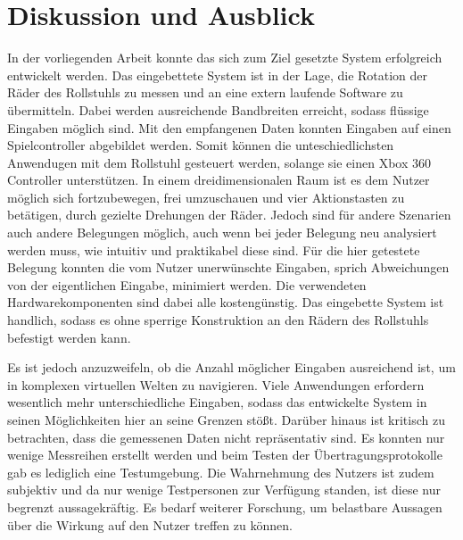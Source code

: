 \chapter{Diskussion und Ausblick}
In der vorliegenden Arbeit konnte das sich zum Ziel gesetzte System erfolgreich entwickelt werden.
Das eingebettete System ist in der Lage, die Rotation der Räder des Rollstuhls zu messen und an eine extern laufende Software zu übermitteln.
Dabei werden ausreichende Bandbreiten erreicht, sodass flüssige Eingaben möglich sind.
Mit den empfangenen Daten konnten Eingaben auf einen Spielcontroller abgebildet werden.
Somit können die unteschiedlichsten Anwendugen mit dem Rollstuhl gesteuert werden, solange sie einen Xbox 360 Controller unterstützen.
In einem dreidimensionalen Raum ist es dem Nutzer möglich sich fortzubewegen, frei umzuschauen und vier Aktionstasten zu betätigen, durch gezielte Drehungen der Räder.
Jedoch sind für andere Szenarien auch andere Belegungen möglich, auch wenn bei jeder Belegung neu analysiert werden muss, wie intuitiv und praktikabel diese sind.
Für die hier getestete Belegung konnten die vom Nutzer unerwünschte Eingaben, sprich Abweichungen von der eigentlichen Eingabe, minimiert werden.
Die verwendeten Hardwarekomponenten sind dabei alle kostengünstig.
Das eingebette System ist handlich, sodass es ohne sperrige Konstruktion an den Rädern des Rollstuhls befestigt werden kann.

Es ist jedoch anzuzweifeln, ob die Anzahl möglicher Eingaben ausreichend ist, um in komplexen virtuellen Welten zu navigieren.
Viele Anwendungen erfordern wesentlich mehr unterschiedliche Eingaben, sodass das entwickelte System in seinen Möglichkeiten hier an seine Grenzen stößt.
Darüber hinaus ist kritisch zu betrachten, dass die gemessenen Daten nicht repräsentativ sind.
Es konnten nur wenige Messreihen erstellt werden und beim Testen der Übertragungsprotokolle gab es lediglich eine Testumgebung.
Die Wahrnehmung des Nutzers ist zudem subjektiv und da nur wenige Testpersonen zur Verfügung standen, ist diese nur begrenzt aussagekräftig.
Es bedarf weiterer Forschung, um belastbare Aussagen über die Wirkung auf den Nutzer treffen zu können.

